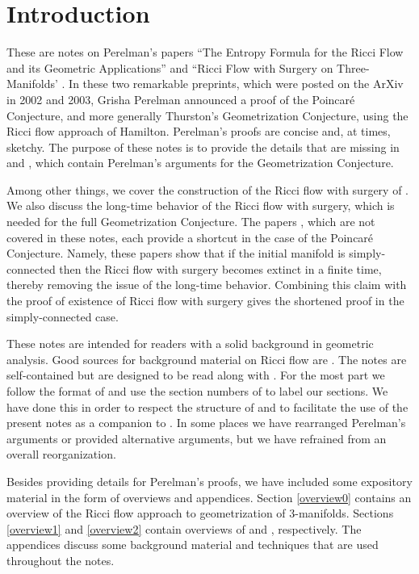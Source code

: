 \section{Introduction}


These are notes on Perelman's papers
``The Entropy Formula for the Ricci Flow and its Geometric
Applications'' \cite{Perelman} and ``Ricci Flow with Surgery
on Three-Manifolds' \cite{Perelman2}.
In these two remarkable preprints, which were posted on the ArXiv
in  2002 and 2003, Grisha Perelman
announced a proof of the Poincar\'e Conjecture, and more generally Thurston's
Geometrization Conjecture, using the Ricci flow approach of Hamilton.
Perelman's proofs are concise and,
at times, sketchy. The purpose of these notes is to provide the details
that are missing in
\cite{Perelman} and \cite{Perelman2}, which contain Perelman's arguments for
the Geometrization Conjecture.

Among other things,
we cover the construction of the Ricci flow with surgery
of \cite{Perelman2}.
We also discuss the long-time behavior of the
Ricci flow with surgery, which is needed for the full Geometrization
Conjecture.
The papers \cite{Colding-Minicozzi,Perelman3},
which are not covered in these notes,
each provide a shortcut in the case of the Poincar\'e Conjecture.
Namely, these papers show
that if the initial manifold is simply-connected then the
Ricci flow with surgery becomes extinct in a
finite time, thereby removing the issue of the long-time
behavior. Combining this claim with the proof of existence of
Ricci flow with surgery gives
the shortened proof in the simply-connected case.

These notes are intended for readers with a solid background in geometric analysis.
Good sources for background material on Ricci flow are
\cite{Chow-Knopf,Chow-Lu-Ni,Hamilton,Topping}.
The notes are self-contained but are designed to be read along with
\cite{Perelman,Perelman2}.
For the most part we follow the format of
\cite{Perelman,Perelman2} and use the section numbers
of \cite{Perelman,Perelman2} to label our
sections. We have done this in order to respect the
structure of \cite{Perelman,Perelman2} and to facilitate the use of
the present notes as a companion to \cite{Perelman,Perelman2}.
 In some places we have rearranged Perelman's arguments
or provided alternative arguments,
but we have refrained from an overall reorganization.

Besides providing details for Perelman's proofs, we have included some
expository material in the form of overviews and appendices.
Section \ref{overview0} contains an overview of the Ricci flow approach to
geometrization of $3$-manifolds. Sections \ref{overview1} and \ref{overview2} contain
overviews of \cite{Perelman} and \cite{Perelman2}, respectively.
The appendices discuss some background material and
techniques that are used throughout the notes.

